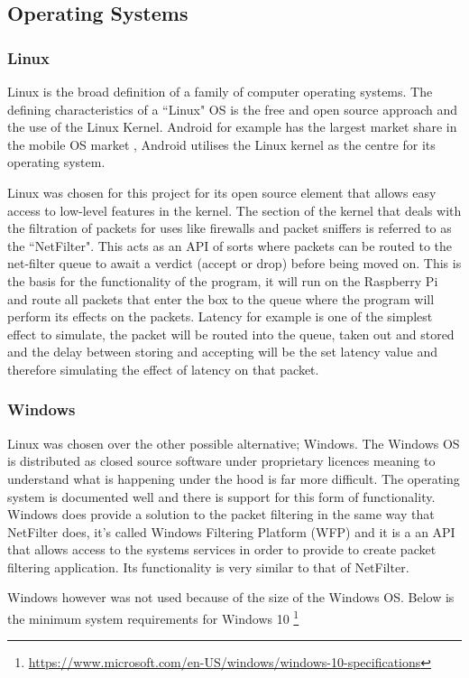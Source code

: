 \subsection{Operating Systems}

\subsubsection{Linux}
Linux is the broad definition of a family of computer operating systems. The defining characteristics of a ``Linux" OS is the free and open source approach and the use of the Linux Kernel. Android for example has the largest market share in the mobile OS market \citep{share2015desktop}, Android utilises the Linux kernel as the centre for its operating system.

Linux was chosen for this project for its open source element that allows easy access to low-level features in the kernel. The section of the kernel that deals with the filtration of packets for uses like firewalls and packet sniffers is referred to as the ``NetFilter". This acts as an API of sorts where packets can be routed to the net-filter queue to await a verdict (accept or drop) before being moved on. This is the basis for the functionality of the program, it will run on the Raspberry Pi and route all packets that enter the box to the queue where the program will perform its effects on the packets. Latency for example is one of the simplest effect to simulate, the packet will be routed into the queue, taken out and stored and the delay between storing and accepting will be the set latency value and therefore simulating the effect of latency on that packet.

\subsubsection{Windows}
Linux was chosen over the other possible alternative; Windows. The Windows OS is distributed as closed source software under proprietary licences meaning to understand what is happening under the hood is far more difficult. The operating system is documented well and there is support for this form of functionality. Windows does provide a solution to the packet filtering in the same way that NetFilter does, it's called Windows Filtering Platform (WFP) and it is a an API that allows access to the systems services in order to provide to create packet filtering application. Its functionality is very similar to that of NetFilter.

Windows however was not used because of the size of the Windows OS. Below is the minimum system requirements for Windows 10 \footnote{\url{https://www.microsoft.com/en-US/windows/windows-10-specifications}}

